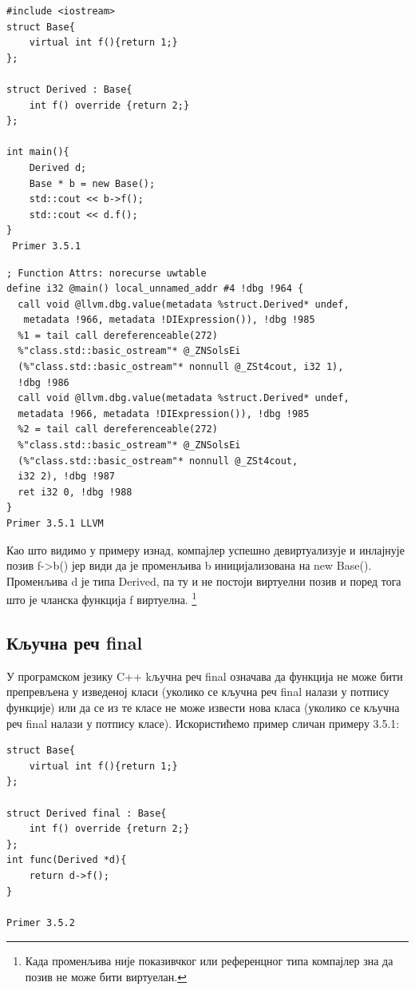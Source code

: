 \documentclass[12pt,oneside]{memoir}
\begin{document}
 \begin{lstlisting}[frame=single]
#include <iostream>
struct Base{
    virtual int f(){return 1;}
};

struct Derived : Base{
    int f() override {return 2;}
};

int main(){
    Derived d;
    Base * b = new Base();
    std::cout << b->f();
    std::cout << d.f();  
}
 Primer 3.5.1
 \end{lstlisting}
 
 \begin{lstlisting}[frame=single]
; Function Attrs: norecurse uwtable
define i32 @main() local_unnamed_addr #4 !dbg !964 {
  call void @llvm.dbg.value(metadata %struct.Derived* undef,
   metadata !966, metadata !DIExpression()), !dbg !985
  %1 = tail call dereferenceable(272) 
  %"class.std::basic_ostream"* @_ZNSolsEi
  (%"class.std::basic_ostream"* nonnull @_ZSt4cout, i32 1), 
  !dbg !986
  call void @llvm.dbg.value(metadata %struct.Derived* undef, 
  metadata !966, metadata !DIExpression()), !dbg !985
  %2 = tail call dereferenceable(272) 
  %"class.std::basic_ostream"* @_ZNSolsEi
  (%"class.std::basic_ostream"* nonnull @_ZSt4cout, 
  i32 2), !dbg !987
  ret i32 0, !dbg !988
}
Primer 3.5.1 LLVM
 \end{lstlisting}
 
 Као што видимо у примеру изнад, компајлер успешно девиртуализује и инлајнује позив 
 f->b() јер види да је променљива b иницијализована на new Base().
 Променљива d је типа Derived, па ту и не постоји виртуелни позив
  и поред тога што је чланска функција f виртуелна.
 \footnote{Када променљива није показивчког или референцног типа 
  компајлер зна да позив не може бити виртуелан.}
 
 \subsection{Кључна реч final}
 У програмском језику C++ kључна реч final означава да функција не може бити 
 препревљена у изведеној класи (уколико се кључна реч final налази у потпису функције)
 или да се из те класе не може извести нова класа (уколико се кључна реч final
 налази у потпису класе).
 Искористићемо пример сличан примеру 3.5.1:
 
\begin{lstlisting}[frame=single]
struct Base{
    virtual int f(){return 1;}
};

struct Derived final : Base{
    int f() override {return 2;}
};
int func(Derived *d){
    return d->f();
}

Primer 3.5.2
\end{lstlisting}
 
\end{document}
